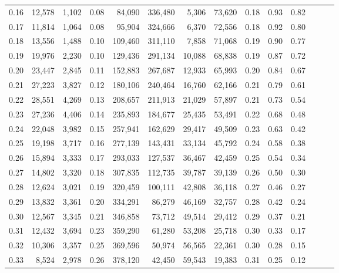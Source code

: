 \begin{tabular}{rrrrrrrrrrrrrr}
0.16 &  12,578 &  1,102 &  0.08 &   84,090 &  336,480 &   5,306 &  73,620 &  0.18 &  0.93 &      0.82 \\
0.17 &  11,814 &  1,064 &  0.08 &   95,904 &  324,666 &   6,370 &  72,556 &  0.18 &  0.92 &      0.80 \\
0.18 &  13,556 &  1,488 &  0.10 &  109,460 &  311,110 &   7,858 &  71,068 &  0.19 &  0.90 &      0.77 \\
0.19 &  19,976 &  2,230 &  0.10 &  129,436 &  291,134 &  10,088 &  68,838 &  0.19 &  0.87 &      0.72 \\
0.20 &  23,447 &  2,845 &  0.11 &  152,883 &  267,687 &  12,933 &  65,993 &  0.20 &  0.84 &      0.67 \\
0.21 &  27,223 &  3,827 &  0.12 &  180,106 &  240,464 &  16,760 &  62,166 &  0.21 &  0.79 &      0.61 \\
0.22 &  28,551 &  4,269 &  0.13 &  208,657 &  211,913 &  21,029 &  57,897 &  0.21 &  0.73 &      0.54 \\
0.23 &  27,236 &  4,406 &  0.14 &  235,893 &  184,677 &  25,435 &  53,491 &  0.22 &  0.68 &      0.48 \\
0.24 &  22,048 &  3,982 &  0.15 &  257,941 &  162,629 &  29,417 &  49,509 &  0.23 &  0.63 &      0.42 \\
0.25 &  19,198 &  3,717 &  0.16 &  277,139 &  143,431 &  33,134 &  45,792 &  0.24 &  0.58 &      0.38 \\
0.26 &  15,894 &  3,333 &  0.17 &  293,033 &  127,537 &  36,467 &  42,459 &  0.25 &  0.54 &      0.34 \\
0.27 &  14,802 &  3,320 &  0.18 &  307,835 &  112,735 &  39,787 &  39,139 &  0.26 &  0.50 &      0.30 \\
0.28 &  12,624 &  3,021 &  0.19 &  320,459 &  100,111 &  42,808 &  36,118 &  0.27 &  0.46 &      0.27 \\
0.29 &  13,832 &  3,361 &  0.20 &  334,291 &   86,279 &  46,169 &  32,757 &  0.28 &  0.42 &      0.24 \\
0.30 &  12,567 &  3,345 &  0.21 &  346,858 &   73,712 &  49,514 &  29,412 &  0.29 &  0.37 &      0.21 \\
0.31 &  12,432 &  3,694 &  0.23 &  359,290 &   61,280 &  53,208 &  25,718 &  0.30 &  0.33 &      0.17 \\
0.32 &  10,306 &  3,357 &  0.25 &  369,596 &   50,974 &  56,565 &  22,361 &  0.30 &  0.28 &      0.15 \\
0.33 &   8,524 &  2,978 &  0.26 &  378,120 &   42,450 &  59,543 &  19,383 &  0.31 &  0.25 &      0.12 \\

\end{tabular}
